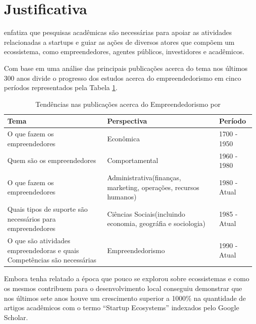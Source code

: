 \section{Justificativa}
\label{section:justificativa}

 enfatiza que pesquisas acadêmicas são necessárias para apoiar as atividades relacionadas a startups e guiar as ações de diversos atores que compõem um ecossistema, como empreendedores, agentes públicos, investidores e acadêmicos.

Com base em uma análise das principais publicações acerca do tema nos últimos 300 anos  divide o progresso dos estudos acerca do empreendedorismo em cinco períodos representados pela Tabela \ref{table:tendencias_nas_publicacoes_acerca_do_empreendedorismo}.

\begin{table}[!htb]
	\centering
	\begin{tabular}{ | p{6cm} | p{6cm} | p{3cm} | }
		\hline
		Tema & Perspectiva & Período \\ \hline
		O que fazem os empreendedores & Econômica & 1700 - 1950 \\ \hline
		Quem são os empreendedores & Comportamental & 1960 - 1980 \\ \hline
		O que fazem os empreendedores & Administrativa(finanças, marketing, operações, recursos humanos) & 1980 - Atual \\ \hline
		Quais tipos de suporte são necessários para empreendedores & Ciências Sociais(incluindo economia, geográfia e sociologia) & 1985 - Atual \\ \hline
		O que são atividades empreendedoras e quais Competências são necessárias & Empreendedorismo & 1990 - Atual \\ \hline
	\end{tabular}
	\caption{Tendências nas publicações acerca do Empreendedorismo por \cite{Filion1998}}
	\label{table:tendencias_nas_publicacoes_acerca_do_empreendedorismo}
\end{table}


Embora  tenha relatado a época que pouco se explorou sobre ecossistemas e como os mesmos contribuem para o desenvolvimento local  conseguiu demonstrar que nos últimos sete anos houve um crescimento superior a 1000\% na quantidade de artigos acadêmicos com o termo ``Startup Ecosystems'' indexados pelo Google Scholar. 

